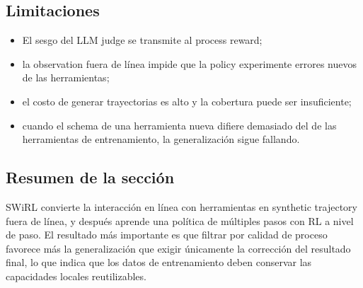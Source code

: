 

\subsection{Limitaciones}

\begin{itemize}
    \item El sesgo del LLM judge se transmite al process reward;
    \item la observation fuera de línea impide que la policy experimente errores nuevos de las herramientas;
    \item el costo de generar trayectorias es alto y la cobertura puede ser insuficiente;
    \item cuando el schema de una herramienta nueva difiere demasiado del de las herramientas de entrenamiento, la generalización sigue fallando.
\end{itemize}

\subsection{Resumen de la sección}

SWiRL convierte la interacción en línea con herramientas en synthetic trajectory fuera de línea, y después aprende una política de múltiples pasos con RL a nivel de paso. El resultado más importante es que filtrar por calidad de proceso favorece más la generalización que exigir únicamente la corrección del resultado final, lo que indica que los datos de entrenamiento deben conservar las capacidades locales reutilizables.
